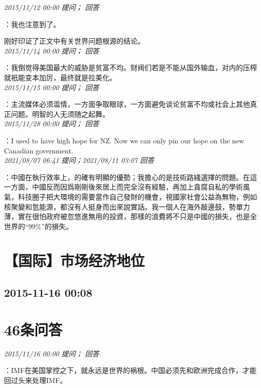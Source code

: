 \documentclass[twocolumn]{ctexart}
\begin{document}
\textit{\hfill\noindent\small 2015/11/12 00:00 提问； 回答}

：我也注意到了。

刚好印证了正文中有关世界问题根源的结论。\\

\textit{\hfill\noindent\small 2015/11/14 00:00 提问； 回答}

：我倒觉得美国最大的威胁是贫富不均。财阀们若是不能从国外输血，对内的压榨就衹能变本加厉，最终就是拉美化。\\

\textit{\hfill\noindent\small 2015/11/15 00:00 提问； 回答}

：主流媒体必须滥情，一方面争取眼球，一方面避免谈论贫富不均或社会上其他真正问题。明智的人无须随之起舞。\\

\textit{\hfill\noindent\small 2015/11/28 00:00 提问； 回答}

：I used to have high hope for NZ. Now we can only pin our hope on the new Canadian government.\\

\textit{\hfill\noindent\small 2021/08/07 06:41 提问；2021/08/11 03:07 回答}

：中國在執行效率上，的確有明顯的優勢；我擔心的是技術路綫選擇的問題。在這一方面，中國反而因爲剛剛後來居上而完全沒有經驗，再加上貪腐自私的學術風氣，科技圈子把大環境的需要當作自己發財的機會，視國家社會公益為無物，例如核聚變和氫能源，都沒有人挺身而出來說實話。我一個人在海外敲邊鼓，勢單力薄，實在很怕政府被忽悠進無用的投資，那樣的浪費將不只是中國的損失，也是全世界的“99\%”的損失。
\\


\section{【国际】市场经济地位}
\subsection{2015-11-16 00:08}


\section{46条问答}

\textit{\hfill\noindent\small 2015/11/16 00:00 提问； 回答}

：IMF在美国掌控之下，就永远是世界的祸根。中国必须先和欧洲完成合作，才能回过头来处理IMF。\\
\end{document}
